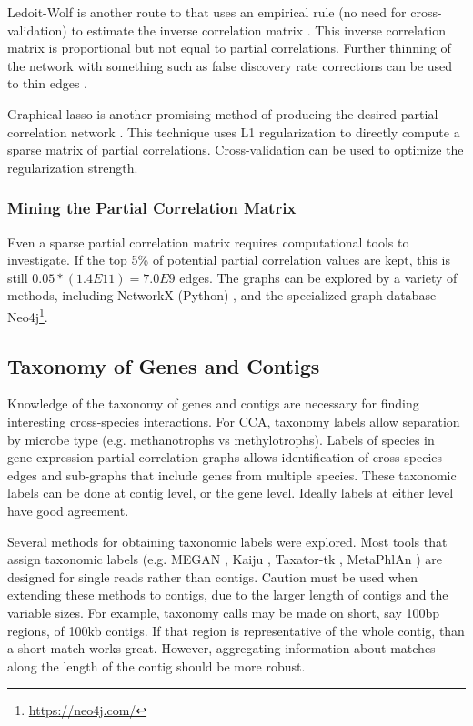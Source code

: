 Ledoit-Wolf is another route to that uses an empirical rule (no need for cross-validation) to estimate the inverse correlation matrix \cite{ledoit2003}.
This inverse correlation matrix is proportional but not equal to partial correlations.
Further thinning of the network with something such as false discovery rate corrections can be used to thin edges \cite{opgen2007Aradopsis}.

Graphical lasso is another promising method of producing the desired partial correlation network \cite{friedman2008}.
This technique uses L1 regularization to directly compute a sparse matrix of partial correlations.
Cross-validation can be used to optimize the regularization strength.

\subsubsection{Mining the Partial Correlation Matrix}
Even a sparse partial correlation matrix requires computational tools to investigate.
If the top 5\% of potential partial correlation values are kept, this is still $0.05*(1.4E11) = 7.0E9$ edges.
The graphs can be explored by a variety of methods, including NetworkX (Python) \cite{schult2008}, and the specialized graph database Neo4j\footnote{\url{https://neo4j.com/}}.

\subsection{Taxonomy of Genes and Contigs}
Knowledge of the taxonomy of genes and contigs are necessary for finding interesting cross-species interactions.
For CCA, taxonomy labels allow separation by microbe type (e.g. methanotrophs vs methylotrophs).
Labels of species in gene-expression partial correlation graphs allows identification of cross-species edges and sub-graphs that include genes from multiple species.
These taxonomic labels can be done at contig level, or the gene level.
Ideally labels at either level have good agreement.

Several methods for obtaining taxonomic labels were explored.
Most tools that assign taxonomic labels (e.g. MEGAN \cite{huson2015}, Kaiju \cite{menzel2016}, Taxator-tk \cite{droge2014}, MetaPhlAn \cite{segata2012}) are designed for single reads rather than contigs.
Caution must be used when extending these methods to contigs, due to the larger length of contigs and the variable sizes.
For example, taxonomy calls may be made on short, say 100bp regions, of 100kb contigs.
If that region is representative of the whole contig, than a short match works great.
However, aggregating information about matches along the length of the contig should be more robust.

